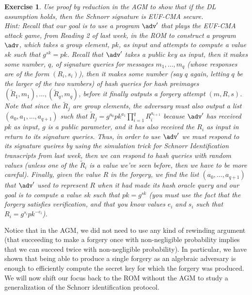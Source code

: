 \documentclass[12pt]{article}
\newtheorem{exercise}{Exercise}
\theoremstyle{definition}
\theoremstyle{remark}
\theoremstyle{definition}
\begin{document}
\begin{exercise}
Use proof by reduction in the AGM to show that if the DL assumption holds, then the Schnorr signature is EUF-CMA secure.\\

Hint: Recall that our goal is to use a program $\adv'$ that plays the EUF-CMA attack game, from Reading 2 of last week, in the ROM to construct a program $\adv$, which takes a group element, $pk$, as input and attempts to compute a value $sk$ such that $g^{sk} = pk$. Recall that $\adv'$ takes a public key as input, then it makes some number, $q$, of signature queries for messages $m_1, \ldots, m_q$ (whose responses are of the form $(R_i, s_i)$), then it makes some number (say $q$ again, letting $q$ be the larger of the two numbers) of hash queries for hash preimages $(\tilde{R}_1, m_1),\ldots, (\tilde{R}_q, m_q)$, before it finally outputs a forgery attempt $(m, R, s)$. Note that since the $\tilde{R}_j$ are group elements, the adversary must also output a list $(a_0, a_1, \ldots, a_{q+1})$ such that $\tilde{R}_j = g^{a_0}pk^{a_1}\prod_{i=1}^qR_i^{a_{i+1}}$ because $\adv'$ has received $pk$ as input, $g$ is a public parameter, and it has also received the $R_i$ as input in return to its signature queries. Thus, in order to use $\adv'$ we must respond to its signature queires by using the simulation trick for Schnorr Identification transcripts from last week, then we can respond to hash queries with random values (unless one of the $\tilde{R}_i$ is a value we've seen before, then we have to be more careful). Finally, given the value $R$ in the forgery, we find the list $(a_0, \ldots, a_{q+1})$ that $\adv'$ used to represent $R$ when it had made its hash oracle query and our goal is to compute a value $sk$ such that $pk = g^{sk}$ (you must use the fact that the forgery satisfies verification, and that you know values $e_i$ and $s_i$ such that $R_i = g^{s_i}pk^{-e_i}$).
\end{exercise}

Notice that in the AGM, we did not need to use any kind of rewinding argument (that succeeding to make a forgery once with non-negligible probability implies that we can succeed twice with non-negligible probability). In particular, we have shown that being able to produce a single forgery as an algebraic adversary is enough to efficiently compute the secret key for which the forgery was produced.\\

We will now shift our focus back to the ROM without the AGM to study a generalization of the Schnorr identification protocol.
\end{document}

